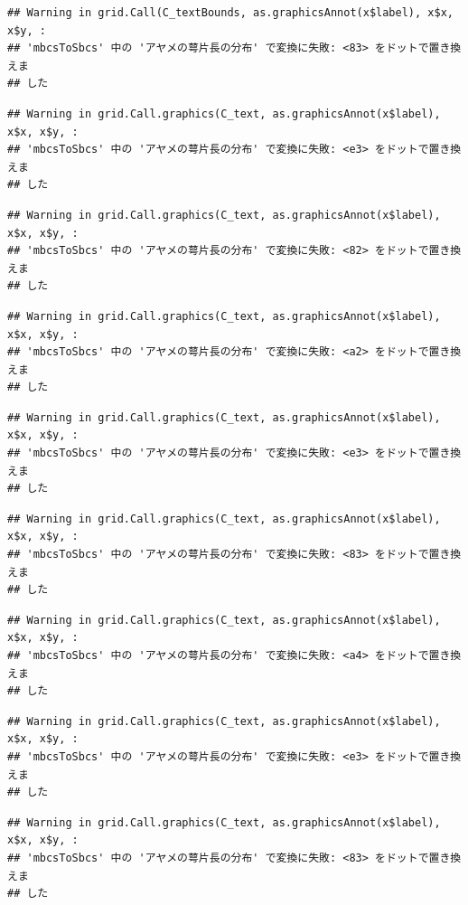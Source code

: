 \documentclass[
]{book}
\begin{document}
\begin{verbatim}
## Warning in grid.Call(C_textBounds, as.graphicsAnnot(x$label), x$x, x$y, :
## 'mbcsToSbcs' 中の 'アヤメの萼片長の分布' で変換に失敗: <83> をドットで置き換えま
## した
\end{verbatim}

\begin{verbatim}
## Warning in grid.Call.graphics(C_text, as.graphicsAnnot(x$label), x$x, x$y, :
## 'mbcsToSbcs' 中の 'アヤメの萼片長の分布' で変換に失敗: <e3> をドットで置き換えま
## した
\end{verbatim}

\begin{verbatim}
## Warning in grid.Call.graphics(C_text, as.graphicsAnnot(x$label), x$x, x$y, :
## 'mbcsToSbcs' 中の 'アヤメの萼片長の分布' で変換に失敗: <82> をドットで置き換えま
## した
\end{verbatim}

\begin{verbatim}
## Warning in grid.Call.graphics(C_text, as.graphicsAnnot(x$label), x$x, x$y, :
## 'mbcsToSbcs' 中の 'アヤメの萼片長の分布' で変換に失敗: <a2> をドットで置き換えま
## した
\end{verbatim}

\begin{verbatim}
## Warning in grid.Call.graphics(C_text, as.graphicsAnnot(x$label), x$x, x$y, :
## 'mbcsToSbcs' 中の 'アヤメの萼片長の分布' で変換に失敗: <e3> をドットで置き換えま
## した
\end{verbatim}

\begin{verbatim}
## Warning in grid.Call.graphics(C_text, as.graphicsAnnot(x$label), x$x, x$y, :
## 'mbcsToSbcs' 中の 'アヤメの萼片長の分布' で変換に失敗: <83> をドットで置き換えま
## した
\end{verbatim}

\begin{verbatim}
## Warning in grid.Call.graphics(C_text, as.graphicsAnnot(x$label), x$x, x$y, :
## 'mbcsToSbcs' 中の 'アヤメの萼片長の分布' で変換に失敗: <a4> をドットで置き換えま
## した
\end{verbatim}

\begin{verbatim}
## Warning in grid.Call.graphics(C_text, as.graphicsAnnot(x$label), x$x, x$y, :
## 'mbcsToSbcs' 中の 'アヤメの萼片長の分布' で変換に失敗: <e3> をドットで置き換えま
## した
\end{verbatim}

\begin{verbatim}
## Warning in grid.Call.graphics(C_text, as.graphicsAnnot(x$label), x$x, x$y, :
## 'mbcsToSbcs' 中の 'アヤメの萼片長の分布' で変換に失敗: <83> をドットで置き換えま
## した
\end{verbatim}
\end{document}
